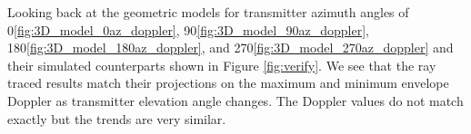 Looking back at the geometric models for transmitter azimuth angles of 0\textdegree \space \ref{fig:3D_model_0az_doppler}, 90\textdegree \space \ref{fig:3D_model_90az_doppler}, 180\textdegree \space \ref{fig:3D_model_180az_doppler}, and 270\textdegree \space \ref{fig:3D_model_270az_doppler} and their simulated counterparts shown in Figure \ref{fig:verify}. We see that the ray traced results match their projections on the maximum and minimum envelope Doppler as transmitter elevation angle changes. The Doppler values do not match exactly but the trends are very similar.

\begin{figure}
\centering
	\newline
\end{figure}
